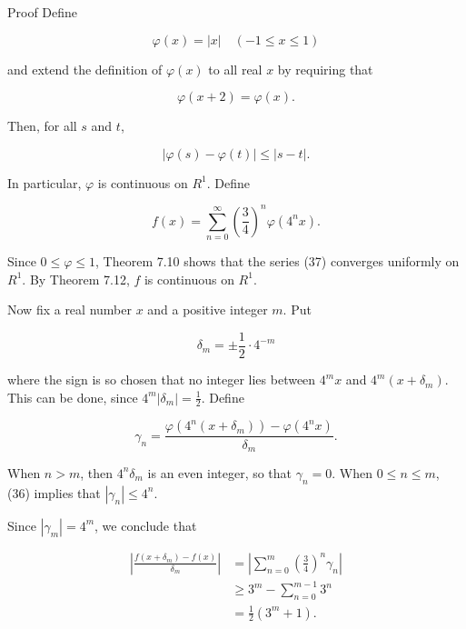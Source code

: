 \documentclass[10pt]{article}
\begin{document}
Proof Define


\begin{equation*}
\varphi(x)=|x| \quad(-1 \leq x \leq 1) \tag{34}
\end{equation*}


and extend the definition of $\varphi(x)$ to all real $x$ by requiring that


\begin{equation*}
\varphi(x+2)=\varphi(x) . \tag{35}
\end{equation*}


Then, for all $s$ and $t$,


\begin{equation*}
|\varphi(s)-\varphi(t)| \leq|s-t| . \tag{36}
\end{equation*}


In particular, $\varphi$ is continuous on $R^{1}$. Define


\begin{equation*}
f(x)=\sum_{n=0}^{\infty}\left(\frac{3}{4}\right)^{n} \varphi\left(4^{n} x\right) . \tag{37}
\end{equation*}


Since $0 \leq \varphi \leq 1$, Theorem 7.10 shows that the series (37) converges uniformly on $R^{1}$. By Theorem 7.12, $f$ is continuous on $R^{1}$.

Now fix a real number $x$ and a positive integer $m$. Put


\begin{equation*}
\delta_{m}= \pm \frac{1}{2} \cdot 4^{-m} \tag{38}
\end{equation*}


where the sign is so chosen that no integer lies between $4^{m} x$ and $4^{m}\left(x+\delta_{m}\right)$. This can be done, since $4^{m}\left|\delta_{m}\right|=\frac{1}{2}$. Define


\begin{equation*}
\gamma_{n}=\frac{\varphi\left(4^{n}\left(x+\delta_{m}\right)\right)-\varphi\left(4^{n} x\right)}{\delta_{m}} . \tag{39}
\end{equation*}


When $n>m$, then $4^{n} \delta_{m}$ is an even integer, so that $\gamma_{n}=0$. When $0 \leq n \leq m$, (36) implies that $\left|\gamma_{n}\right| \leq 4^{n}$.

Since $\left|\gamma_{m}\right|=4^{m}$, we conclude that

$$
\begin{aligned}
\left|\frac{f\left(x+\delta_{m}\right)-f(x)}{\delta_{m}}\right| & =\left|\sum_{n=0}^{m}\left(\frac{3}{4}\right)^{n} \gamma_{n}\right| \\
& \geq 3^{m}-\sum_{n=0}^{m-1} 3^{n} \\
& =\frac{1}{2}\left(3^{m}+1\right) .
\end{aligned}
$$
\end{document}
